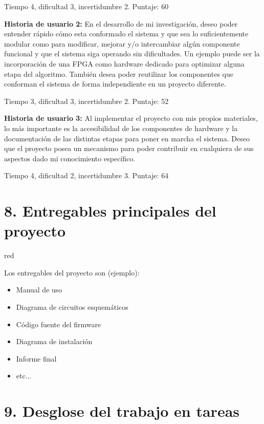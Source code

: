 \documentclass[
11pt, %
codirector, %
]{charter}
\begin{document}
Tiempo 4, dificultad 3, incertidumbre 2. Puntaje: 60 

\textbf{Historia de usuario 2:} En el desarrollo de mi investigación, deseo poder entender rápido cómo esta conformado el sistema y que sea lo suficientemente modular como para modificar, mejorar y/o intercambiar algún componente funcional y que el sistema siga operando sin dificultades. Un ejemplo puede ser la incorporación de una FPGA como hardware dedicado para optimizar alguna etapa del algoritmo. También desea poder reutilizar los componentes que conforman el sistema de forma independiente en un proyecto diferente.

Tiempo 3, dificultad 3, incertidumbre 2. Puntaje: 52

\textbf{Historia de usuario 3:} Al implementar el proyecto con mis propios materiales, lo más importante es la accesibilidad de los componentes de hardware y la documentación de las distintas etapas para poner en marcha el sistema. Deseo que el proyecto posea un mecanismo para poder contribuir en cualquiera de sus aspectos dado mi conocimiento específico.

Tiempo 4, dificultad 2, incertidumbre 3. Puntaje: 64


\section{8. Entregables principales del proyecto}
\label{sec:entregables}

\begin{consigna}{red}

Los entregables del proyecto son (ejemplo):

\begin{itemize}
	\item Manual de uso
	\item Diagrama de circuitos esquemáticos
	\item Código fuente del firmware
	\item Diagrama de instalación
	\item Informe final
	\item etc...
\end{itemize}

\end{consigna}

\section{9. Desglose del trabajo en tareas}
\label{sec:wbs}
\end{document}
